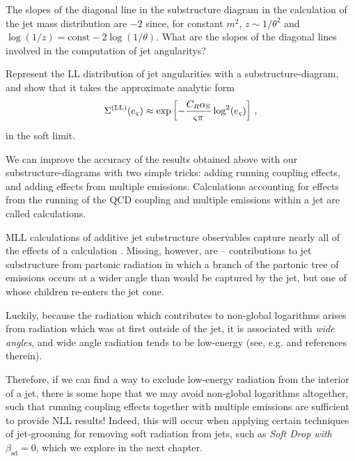 \begin{exercise}
    The slopes of the diagonal line in the substructure diagram in the calculation of the jet mass distribution are \(-2\) since, for constant \(m^2\), \(z \sim 1/\theta^2\) and \(\log(1/z) = \text{const} - 2 \log(1/\theta)\).
    What are the slopes of the diagonal lines involved in the computation of jet \glspl{angularity}?

    Represent the LL distribution of jet angularities with a \gls{substructure-diagram}, and show that it takes the approximate analytic form
    \begin{align}
        \Sigma^{(\text{LL})}(e_\varsigma)
        \approx
        \exp\left[
            -\frac{C_R\alpha_{\rm S}}{\varsigma \pi}\log^2(e_\varsigma)
        \right]
        \,,
    \end{align}
    in the soft limit.
\end{exercise}

We can improve the accuracy of the results obtained above with our \glspl{substructure-diagram} with two simple tricks:
%
adding running coupling effects, and adding effects from multiple emissions.
%
Calculations accounting for effects from the running of the QCD coupling and multiple emissions within a jet are called  calculations.

MLL calculations of additive jet substructure observables capture nearly all of the effects of a  calculation \cite{Marzani:2019hun}.
%
Missing, however, are  -- contributions to jet substructure from partonic radiation in which a branch of the partonic tree of emissions occurs at a wider angle than would be captured by the jet, but one of whose children re-enters the jet cone.\cite{Dasgupta:2001sh,Appleby:2002ke,Weigert:2003mm,Rubin:2010fc,Banfi:2010pa,Hornig:2011iu,Kelley:2011aa,Hatta:2013iba,Schwartz:2014wha,Khelifa-Kerfa:2015mma,Larkoski:2016zzc,Marzani:2019hun,Banfi:2021owj,Banfi:2021xzn,}

Luckily, because the radiation which contributes to non-global logarithms arises from radiation which was at first outside of the jet, it is associated with \textit{wide angles}, and wide angle radiation tends to be low-energy (see, e.g.  and references therein).

Therefore, if we can find a way to exclude low-energy radiation from the interior of a jet, there is some hope that we may avoid non-global logarithms altogether, such that running coupling effects together with multiple emissions are sufficient to provide NLL results!
%
Indeed, this will occur when applying certain techniques of \gls{jet-grooming} for removing soft radiation from jets, such as \textit{Soft Drop with \(\beta_\text{sd}= 0\)}, which we explore in the next chapter.


